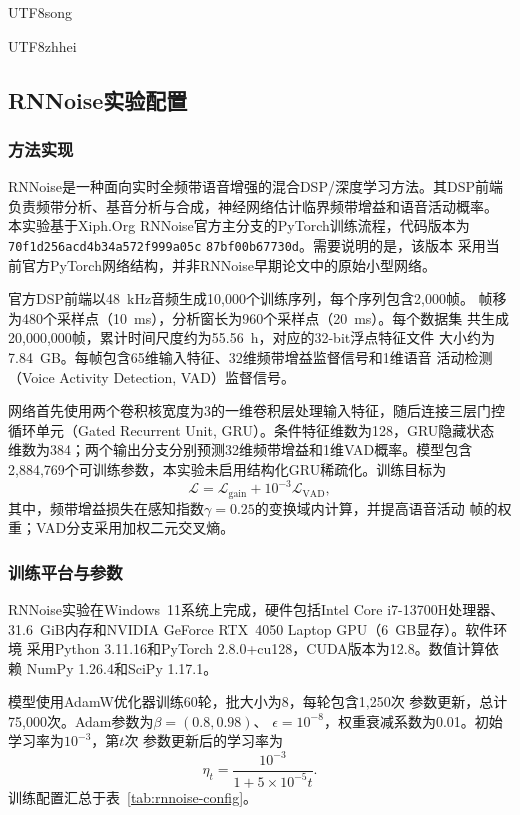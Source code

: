 \documentclass[10.5pt,compsoc]{CjC}
\theoremstyle{mystyle}
\begin{document}
\begin{CJK*}{UTF8}{song}
{\begin{CJK*}{UTF8}{zhhei}\subsection{RNNoise实验配置}\end{CJK*}}
\label{subsec:rnnoise-configuration}

\subsubsection{方法实现}

RNNoise是一种面向实时全频带语音增强的混合DSP/深度学习方法。其DSP前端
负责频带分析、基音分析与合成，神经网络估计临界频带增益和语音活动概率。
本实验基于Xiph.Org RNNoise官方主分支的PyTorch训练流程，代码版本为
\texttt{70f1d256acd4b34a572f999a05c}\allowbreak
\texttt{87bf00b67730d}。需要说明的是，该版本
采用当前官方PyTorch网络结构，并非RNNoise早期论文中的原始小型网络。

官方DSP前端以48~kHz音频生成10,000个训练序列，每个序列包含2,000帧。
帧移为480个采样点（10~ms），分析窗长为960个采样点（20~ms）。每个数据集
共生成20,000,000帧，累计时间尺度约为55.56~h，对应的32-bit浮点特征文件
大小约为7.84~GB。每帧包含65维输入特征、32维频带增益监督信号和1维语音
活动检测（Voice Activity Detection, VAD）监督信号。

网络首先使用两个卷积核宽度为3的一维卷积层处理输入特征，随后连接三层门控
循环单元（Gated Recurrent Unit, GRU）。条件特征维数为128，GRU隐藏状态
维数为384；两个输出分支分别预测32维频带增益和1维VAD概率。模型包含
2,884,769个可训练参数，本实验未启用结构化GRU稀疏化。训练目标为
\begin{equation}
\mathcal{L}=\mathcal{L}_{\mathrm{gain}}+10^{-3}\mathcal{L}_{\mathrm{VAD}},
\label{eq:rnnoise-loss}
\end{equation}
其中，频带增益损失在感知指数$\gamma=0.25$的变换域内计算，并提高语音活动
帧的权重；VAD分支采用加权二元交叉熵。

\subsubsection{训练平台与参数}

RNNoise实验在Windows~11系统上完成，硬件包括Intel Core i7-13700H处理器、
31.6~GiB内存和NVIDIA GeForce RTX~4050 Laptop GPU（6~GB显存）。软件环境
采用Python 3.11.16和PyTorch 2.8.0+cu128，CUDA版本为12.8。数值计算依赖
NumPy 1.26.4和SciPy 1.17.1。

模型使用AdamW优化器训练60轮，批大小为8，每轮包含1,250次
参数更新，总计75,000次。Adam参数为$\beta=(0.8,0.98)$、
$\epsilon=10^{-8}$，权重衰减系数为0.01。初始学习率为$10^{-3}$，第$t$次
参数更新后的学习率为
\begin{equation}
\eta_t=\frac{10^{-3}}{1+5\times10^{-5}t}.
\label{eq:rnnoise-lr}
\end{equation}
训练配置汇总于表~\ref{tab:rnnoise-config}。


\end{CJK*}
\end{document}
